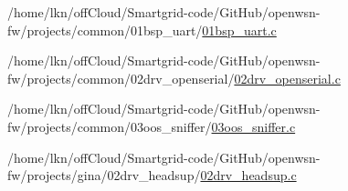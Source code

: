 \begin{DoxyCompactItemize}
/home/lkn/off\+Cloud/\+Smartgrid-\/code/\+Git\+Hub/openwsn-\/fw/projects/common/01bsp\+\_\+uart/\hyperlink{01bsp__uart_8c}{01bsp\+\_\+uart.\+c}\item 
/home/lkn/off\+Cloud/\+Smartgrid-\/code/\+Git\+Hub/openwsn-\/fw/projects/common/02drv\+\_\+openserial/\hyperlink{02drv__openserial_8c}{02drv\+\_\+openserial.\+c}\item 
/home/lkn/off\+Cloud/\+Smartgrid-\/code/\+Git\+Hub/openwsn-\/fw/projects/common/03oos\+\_\+sniffer/\hyperlink{03oos__sniffer_8c}{03oos\+\_\+sniffer.\+c}\item 
/home/lkn/off\+Cloud/\+Smartgrid-\/code/\+Git\+Hub/openwsn-\/fw/projects/gina/02drv\+\_\+headsup/\hyperlink{02drv__headsup_8c}{02drv\+\_\+headsup.\+c}\end{DoxyCompactItemize}
